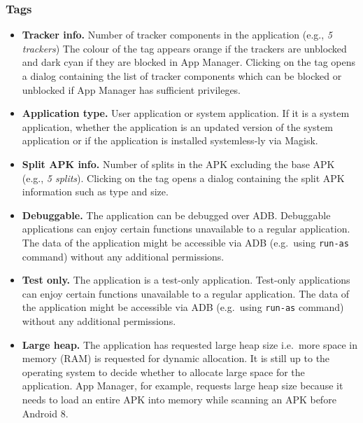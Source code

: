 \subsubsection{Tags}\label{subsubsec:tags} %
\begin{itemize}
    \item \textbf{Tracker info.} Number of tracker components in the application (e.g., \textit{5 trackers}) The colour
    of the tag appears orange if the trackers are unblocked and dark cyan if they are blocked in App Manager.
    Clicking on the tag opens a dialog containing the list of tracker components which can be blocked or unblocked if
    App Manager has sufficient privileges.

    \item \textbf{Application type.} User application or system application. If it is a system application, whether
    the application is an updated version of the system application or if the application is installed systemless-ly
    via Magisk.

    \item \textbf{Split APK info.} Number of splits in the APK excluding the base APK (e.g., \textit{5 splits}).
    Clicking on the tag opens a dialog containing the split APK information such as type and size.

    \item \textbf{Debuggable.} The application can be debugged over ADB\@. Debuggable applications can enjoy certain
    functions unavailable to a regular application. The data of the application might be accessible via ADB (e.g.\ using
    \texttt{run-as} command) without any additional permissions.

    \item \textbf{Test only.} The application is a test-only application. Test-only applications can enjoy certain
    functions unavailable to a regular application. The data of the application might be accessible via ADB (e.g.\ using
    \texttt{run-as} command) without any additional permissions.

    \item \textbf{Large heap.} The application has requested large heap size i.e.\ more space in memory (RAM) is
    requested for dynamic allocation. It is still up to the operating system to decide whether to allocate large space
    for the application. App Manager, for example, requests large heap size because it needs to load an entire APK
    into memory while scanning an APK before Android 8.


\end{itemize}
